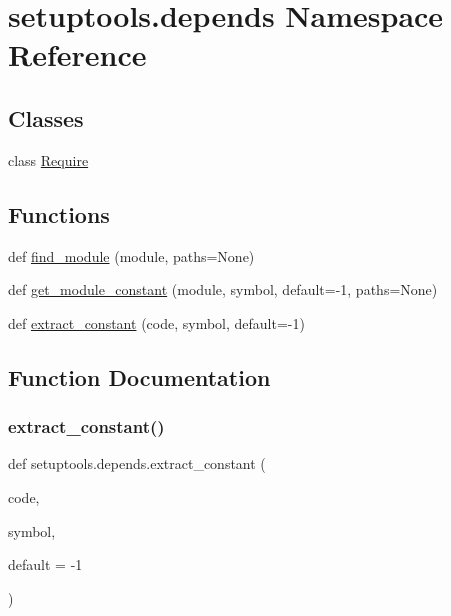 \hypertarget{namespacesetuptools_1_1depends}{}\section{setuptools.\+depends Namespace Reference}
\label{namespacesetuptools_1_1depends}
\subsection*{Classes}
\begin{DoxyCompactItemize}
\item 
class \hyperlink{classsetuptools_1_1depends_1_1_require}{Require}
\end{DoxyCompactItemize}
\subsection*{Functions}
\begin{DoxyCompactItemize}
\item 
def \hyperlink{namespacesetuptools_1_1depends_a4a94ecfdec67b2f432eed142f7cafaf5}{find\+\_\+module} (module, paths=None)
\item 
def \hyperlink{namespacesetuptools_1_1depends_a5a13c841cb5ec0ec368eb437b3e7c615}{get\+\_\+module\+\_\+constant} (module, symbol, default=-\/1, paths=None)
\item 
def \hyperlink{namespacesetuptools_1_1depends_a49bf4636dee480cc02cef0d9e81ca05e}{extract\+\_\+constant} (code, symbol, default=-\/1)
\end{DoxyCompactItemize}


\subsection{Function Documentation}
\mbox{\label{namespacesetuptools_1_1depends_a49bf4636dee480cc02cef0d9e81ca05e}} 
\subsubsection{\texorpdfstring{extract\+\_\+constant()}{extract\_constant()}}
{\footnotesize\ttfamily def setuptools.\+depends.\+extract\+\_\+constant (\begin{DoxyParamCaption}\item[{}]{code,  }\item[{}]{symbol,  }\item[{}]{default = {\ttfamily -\/1} }\end{DoxyParamCaption})}

